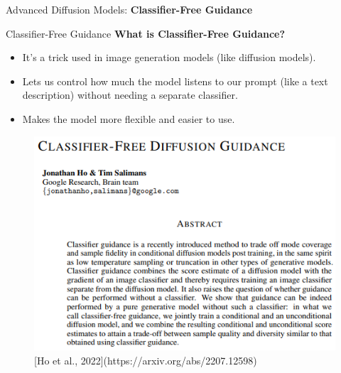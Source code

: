\begin{frame}{}
    \LARGE Advanced Diffusion Models: \textbf{Classifier-Free Guidance}
\end{frame}

\begin{frame}[allowframebreaks]{Classifier-Free Guidance}
    \textbf{What is Classifier-Free Guidance?}
    \begin{itemize}
        \item It's a trick used in image generation models (like diffusion models).
        \item Lets us control how much the model listens to our prompt (like a text description) without needing a separate classifier.
        \item Makes the model more flexible and easier to use.
    \end{itemize}

    \framebreak

    \begin{figure}
        \centering
        \includegraphics[width=0.8\linewidth,height=\textheight,keepaspectratio]{images/adv-img-gen/classifier-free-guidance-1.png}
        \caption*{[Ho et al., 2022](https://arxiv.org/abs/2207.12598)}
    \end{figure}

    \framebreak


\end{frame}
